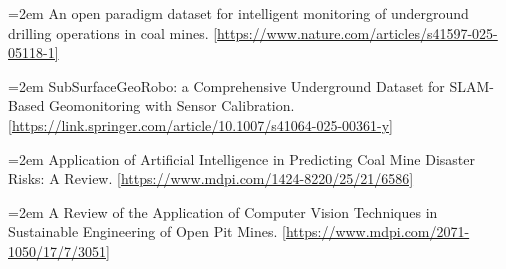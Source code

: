 \documentclass[UTF8,zihao=-4,fontset=fandol]{ctexart}
\begin{document}
\hangindent=2em  \noindent [8] An open paradigm dataset for intelligent monitoring of underground drilling operations in coal mines.  [\url{https://www.nature.com/articles/s41597-025-05118-1]}

\hangindent=2em  \noindent [9] SubSurfaceGeoRobo: a Comprehensive Underground Dataset for SLAM-Based Geomonitoring with Sensor Calibration.  [\url{https://link.springer.com/article/10.1007/s41064-025-00361-y]}

\hangindent=2em  \noindent [10] Application of Artificial Intelligence in Predicting Coal Mine Disaster Risks: A Review.  [\url{https://www.mdpi.com/1424-8220/25/21/6586]}

\hangindent=2em  \noindent [11] A Review of the Application of Computer Vision Techniques in Sustainable Engineering of Open Pit Mines.  [\url{https://www.mdpi.com/2071-1050/17/7/3051]}
\end{document}

